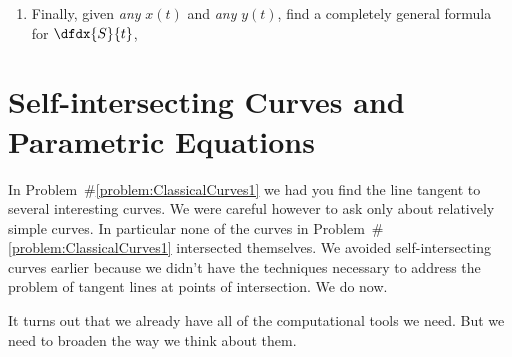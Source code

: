 \begin{embeddedproblem}
\begin{enumerate}[label={\bf{}(\alph*)}]
\begin{enumerate}[label={\bf{}\roman*.}]
        then
        $\displaystyle\dfdx{S}{t}=\frac{\sqrt{2}}{4\sqrt[4]{t^3}}$.
      \item Do you see a pattern yet? If you do write it down and try
        to show that it always holds. If you don't make up some more
        simple examples, solve them to gather more evidence, and
        conjecture a pattern when you believe you have one. Then show
        that the pattern always holds.
      \end{enumerate}
    \item Finally, given \emph{any} $x(t)$ and \emph{any} $y(t)$, find
      a completely general formula for $\dfdx{S}{t}$,
    \end{enumerate}
    \vskip-6mm{}
  \end{embeddedproblem}




\section{Self-intersecting Curves and Parametric Equations}
\label{sec:self-inters-curv}
In Problem~\#\ref{problem:ClassicalCurves1} we had you find the line
tangent to several interesting curves.  We were careful however to ask
only about relatively simple curves. In particular none of the curves
in Problem~\#\ref{problem:ClassicalCurves1} intersected themselves. We
avoided self-intersecting curves earlier because we didn't have the
techniques necessary to address the problem of tangent lines at points
of intersection. We do now.

It turns out that we already have all of the computational tools we
need. But we need to broaden the way we think about them.

